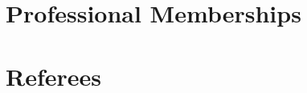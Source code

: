 \documentclass[11pt,a4paper,]{moderncv}
\begin{document}
\hypertarget{professional-memberships}{%
\section{Professional Memberships}\label{professional-memberships}}

\nopagebreak

\hypertarget{referees}{%
\section{Referees}\label{referees}}

\nopagebreak
\end{document}
